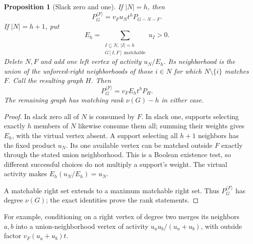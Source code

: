 \documentclass[11pt,a4paper]{article}
\newtheorem{proposition}[theorem]{Proposition}
\theoremstyle{remark}\newtheorem{remark}[theorem]{Remark}
\begin{document}
\begin{proposition}[Slack zero and one]\label{mrn:s:rb:prop:smallslack}
If $|N|=h$, then
\[
 P_G^{\langle F\rangle}=v_Fu_Nt^hP_{G-N-F}.
\]
If $|N|=h+1$, put
\[
 E_h=\sum_{\substack{I\subseteq N,\ |I|=h\\G[I,F]\text{ matchable}}}u_I>0.
\]
Delete $N,F$ and add one left vertex of activity $u_N/E_h$. Its neighborhood is the union of the unforced-right neighborhoods of those $i\in N$ for which $N\setminus\{i\}$ matches $F$. Call the resulting graph $H$. Then
\begin{equation}\label{mrn:s:rb:eq:slackone}
 P_G^{\langle F\rangle}=v_FE_ht^hP_H.
\end{equation}
The remaining graph has matching rank $\nu(G)-h$ in either case.
\end{proposition}
\begin{proof}
In slack zero all of $N$ is consumed by $F$. In slack one, supports selecting exactly $h$ members of $N$ likewise consume them all; summing their weights gives $E_h$, with the virtual vertex absent. A support selecting all $h+1$ neighbors has the fixed product $u_N$. Its one available vertex can be matched outside $F$ exactly through the stated union neighborhood. This is a Boolean existence test, so different successful choices do not multiply a support's weight. The virtual activity makes $E_h(u_N/E_h)=u_N$.

A matchable right set extends to a maximum matchable right set. Thus $P_G^{\langle F\rangle}$ has degree $\nu(G)$; the exact identities prove the rank statements.
\end{proof}
For example, conditioning on a right vertex of degree two merges its neighbors $a,b$ into a union-neighborhood vertex of activity $u_au_b/(u_a+u_b)$, with outside factor $v_F(u_a+u_b)t$.
\end{document}
